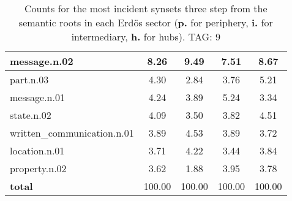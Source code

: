 \begin{table}[h!]
\begin{center}
\begin{tabular}{| l || c | c | c | c |}
message.n.02 & 8.26  & 9.49  & 7.51  & 8.67 \\\hline
part.n.03 & 4.30  & 2.84  & 3.76  & 5.21 \\\hline
message.n.01 & 4.24  & 3.89  & 5.24  & 3.34 \\\hline
state.n.02 & 4.09  & 3.50  & 3.82  & 4.51 \\\hline
written\_communication.n.01 & 3.89  & 4.53  & 3.89  & 3.72 \\\hline
location.n.01 & 3.71  & 4.22  & 3.44  & 3.84 \\\hline
property.n.02 & 3.62  & 1.88  & 3.95  & 3.78 \\\hline\hline
{{\bf total}} & 100.00  & 100.00  & 100.00  & 100.00 \\\hline
\end{tabular}
\caption{Counts for the most incident synsets three step from the semantic roots in each Erd\"os sector ({\bf p.} for periphery, {\bf i.} for intermediary, {\bf h.} for hubs). TAG: 9}
\end{center}
\end{table}